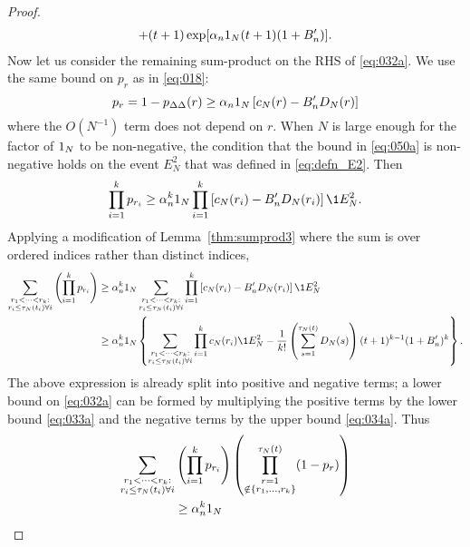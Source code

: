 \begin{proof}
\begin{align}
        + (t+1) \exp[ \alpha_n 1_N (t+1) (1+B_n^\prime) ] .
        \label{eq:034a}
\end{align}
Now let us consider the remaining sum-product on the RHS of \eqref{eq:032a}.
We use the same bound on $p_r$ as in \eqref{eq:018}:
\begin{equation}\label{eq:050a}
p_r
= 1 -p_{\Delta\Delta}(r) 
\geq \alpha_n 1_N 
        \left[ c_N(r) - B_n^\prime D_N(r) \right] 
\end{equation}
where the $O(N^{-1})$ term does not depend on $r$.
When $N$ is large enough for the factor of $1_N$ to be non-negative, the condition that the bound in \eqref{eq:050a} is non-negative holds on the event $E_N^2$ that was defined in \eqref{eq:defn_E2}.
Then
\begin{equation*}
\prod_{i=1}^k p_{r_i}
\geq \alpha_n^k \ON 
        \prod_{i=1}^k \left[ c_N(r_i) - B_n^\prime D_N(r_i) \right] \1{E_N^2} .
\end{equation*}
Applying a modification of Lemma~\ref{thm:sumprod3} where the sum is over ordered indices rather than distinct indices,
\begin{align*}
\sum_{\substack{r_1 <\dots< r_k :\\ r_i \leq \tau_N(t_i) \forall i}}
        \left( \prod_{i=1}^k p_{r_i} \right)
&\geq \alpha_n^k \ON \sum_{\substack{r_1 <\dots< r_k 
        :\\ r_i \leq \tau_N(t_i) \forall i}} \prod_{i=1}^k
        \left[ c_N(r_i) - B_n^\prime D_N(r_i) \right] \1{E_N^2} \\
&\geq \alpha_n^k \ON \left\{
        \sum_{\substack{r_1 <\dots< r_k :\\ r_i \leq \tau_N(t_i) \forall i}}
        \prod_{i=1}^k c_N(r_i) \1{E_N^2}
        - \frac{1}{k!} \left( \sum_{s=1}^{\tau_N(t)} D_N(s) \right)
        (t+1)^{k-1} (1+B_n^\prime)^k \right\} .
\end{align*}
The above expression is already split into positive and negative terms; a lower bound on \eqref{eq:032a} can be formed by multiplying the positive terms by the lower bound \eqref{eq:033a} and the negative terms by the upper bound \eqref{eq:034a}. 
Thus
\begin{align*}
\sum_{\substack{r_1 <\dots< r_k :\\ r_i \leq \tau_N(t_i) \forall i}}
        &\left( \prod_{i=1}^k p_{r_i} \right)
        \left( \prod_{\substack{r=1 \\ \notin \{r_1,\dots,r_k\} }}^{\tau_N(t)} 
        (1-p_r) \right) \\
&\geq \alpha_n^k \ON

\end{align*}
\end{proof}
